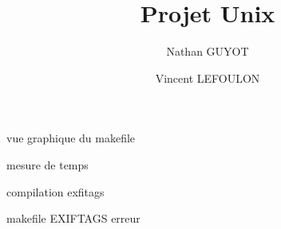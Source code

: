 \documentclass[a4paper,11pt]{article}
\title{Projet Unix}
\author{Nathan GUYOT \and Vincent LEFOULON}
\begin{document}
\maketitle

vue graphique du makefile

mesure de temps

compilation exfitags

makefile EXIFTAGS erreur



\end{document}
